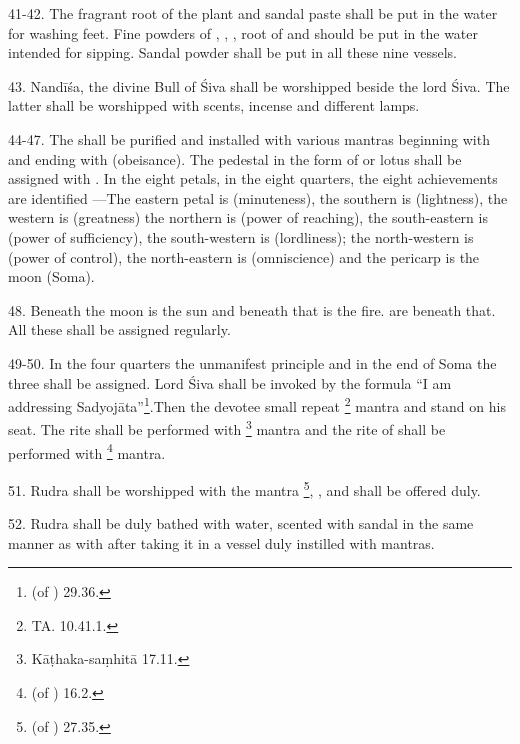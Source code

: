 41-42. The fragrant root of the plant  and sandal paste shall be put
in the water for washing feet. Fine powders of , ,
, root of  and  should be put in the water
intended for sipping. Sandal powder shall be put in all these nine vessels.

43. Nandīśa, the divine Bull of Śiva shall be worshipped beside the lord Śiva.
The latter shall be worshipped with scents, incense and different lamps.

44-47. The  shall be purified and installed with various mantras
beginning with  and ending with  (obeisance). The pedestal
in the form of  or lotus shall be assigned with . In
the eight petals, in the eight quarters, the eight achievements are identified
\viz—The eastern petal is  (minuteness), the southern is 
(lightness), the western is  (greatness) the northern is 
(power of reaching), the south-eastern is  (power of sufficiency),
the south-western is  (lordliness); the north-western is 
(power of control), the north-eastern is  (omniscience) and
the pericarp is the moon (Soma).

48. Beneath the moon is the sun and beneath that is the fire.  \etc
are beneath that. All these shall be assigned regularly.

49-50. In the four quarters  \etc the unmanifest principle and in
the end of Soma the three  shall be assigned. Lord Śiva shall be
invoked by the formula “I am addressing Sadyojāta”\footnote{
 (of ) 29.36.}.Then the devotee small
repeat \footnote{TA. 10.41.1.} mantra and stand on his seat.
The  rite shall be performed with 
\footnote{Kāṭhaka-saṃhitā 17.11.} mantra and the rite of  shall be
performed with \footnote{ (of
) 16.2.} mantra.

51. Rudra shall be worshipped with the mantra 
\footnote{ (of ) 27.35.}, ,
 and  shall be offered duly.

52. Rudra shall be duly bathed with water, scented with sandal in the same
manner as with  after taking it in a vessel duly instilled with
mantras.

